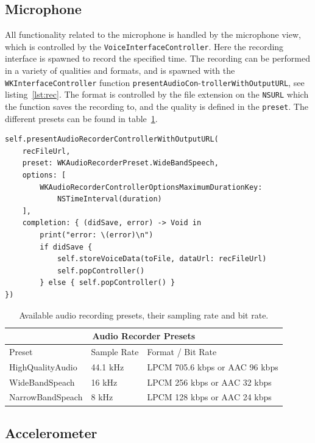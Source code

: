 \subsection{Microphone}
All functionality related to the microphone is handled by the microphone view,
which is controlled by the \texttt{VoiceInterfaceController}.
Here the recording interface is spawned to record the specified time. The
recording can be performed in a variety of qualities and formats, and is spawned
with the \texttt{WKInterfaceController} function
\texttt{presentAudioCon}-\texttt{trollerWithOutputURL}, see listing~\ref{lst:rec}. The format is
controlled by the file extension on the \texttt{NSURL} which the function saves
the recording to, and the quality is defined in the \texttt{preset}. The
different presets can be found in table~\ref{tbl:rec}.

\begin{lstlisting}[label={lst:rec}, caption={Spawning of the audio recording
    controller.},basicstyle=\small]
self.presentAudioRecorderControllerWithOutputURL(
    recFileUrl,
    preset: WKAudioRecorderPreset.WideBandSpeech,
    options: [
        WKAudioRecorderControllerOptionsMaximumDurationKey: 
            NSTimeInterval(duration)
    ],
    completion: { (didSave, error) -> Void in
        print("error: \(error)\n")
        if didSave {
            self.storeVoiceData(toFile, dataUrl: recFileUrl)
            self.popController()
        } else { self.popController() }
})
\end{lstlisting}

\begin{table}[!h]
\caption{Available audio recording presets, their sampling rate and bit rate.}
\label{tbl:rec}
\centering
\begin{tabular}{ |l|l|l|  }
\hline
\multicolumn{3}{|c|}{Audio Recorder Presets} \\
\hline
Preset             & Sample Rate & Format / Bit Rate\\
\hline
HighQualityAudio   & 44.1 kHz    & LPCM 705.6 kbps or AAC 96 kbps \\
WideBandSpeach     & 16 kHz      & LPCM 256 kbps or AAC 32 kbps \\
NarrowBandSpeach   & 8 kHz       & LPCM 128 kbps or AAC 24 kbps \\
\hline
\end{tabular}
\end{table}

\subsection{Accelerometer}


